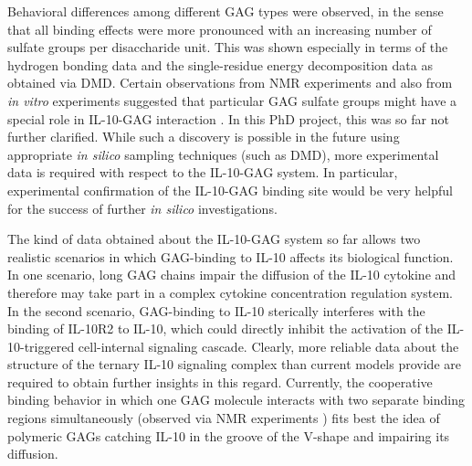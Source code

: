 
Behavioral differences among different GAG types were observed, in the sense
that all binding effects were more pronounced with an increasing number of
sulfate groups per disaccharide unit. This was shown especially in terms of the
hydrogen bonding data and the single-residue energy decomposition data as
obtained via DMD. Certain observations from NMR experiments and also from
\textit{in vitro} experiments suggested that particular GAG sulfate groups
might have a special role in IL-10-GAG interaction \cite{salek_ardakani_2000,
kuenze_gehrcke_2014}. In this PhD project, this was so far not further
clarified. While such a discovery is possible in the future using appropriate
\textit{in silico} sampling techniques (such as DMD), more experimental data is
required with respect to the IL-10-GAG system. In particular, experimental
confirmation of the IL-10-GAG binding site would be very helpful for the success
of further \textit{in silico} investigations.

The kind of data obtained about the IL-10-GAG system so far allows two realistic
scenarios in which GAG-binding to IL-10 affects its biological function. In one
scenario, long GAG chains impair the diffusion of the IL-10 cytokine and
therefore may take part in a complex cytokine concentration regulation system.
In the second scenario, GAG-binding to IL-10 sterically interferes with the
binding of IL-10R2 to IL-10, which could directly inhibit the activation of the
IL-10-triggered cell-internal signaling cascade. Clearly, more reliable data
about the structure of the ternary IL-10 signaling complex than current models
provide are required to obtain further insights in this regard. Currently, the
cooperative binding behavior in which one GAG molecule interacts with two
separate binding regions simultaneously (observed via NMR experiments
\cite{kuenze_gehrcke_2014}) fits best the idea of polymeric GAGs catching IL-10
in the groove of the V-shape and impairing its diffusion.

